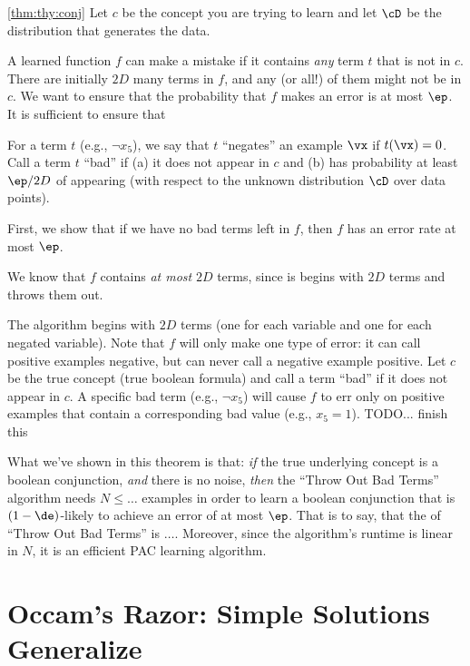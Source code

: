 \begin{myproof}{\ref{thm:thy:conj}}
  Let $c$ be the concept you are trying to learn and let $\cD$ be the
  distribution that generates the data.


  A learned function $f$ can make a mistake if it contains \emph{any}
  term $t$ that is not in $c$.  There are initially $2D$ many terms in
  $f$, and any (or all!) of them might not be in $c$.  We want to
  ensure that the probability that $f$ makes an error is at most
  $\ep$.  It is sufficient to ensure that

For a term $t$
  (e.g., $\lnot x_5$), we say that $t$ ``negates'' an example $\vx$ if
  $t(\vx) = 0$.  Call a term $t$ ``bad'' if (a) it does not appear in
  $c$ and (b) has probability at least $\ep/2D$ of appearing (with
  respect to the unknown distribution $\cD$ over data points).

  First, we show that if we have no bad terms left in $f$, then $f$
  has an error rate at most $\ep$.

We know that $f$ contains \emph{at
    most} $2D$ terms, since is begins with $2D$ terms and throws them
  out.

  The algorithm begins with $2D$ terms (one for each variable and one
  for each negated variable).  Note that $f$ will only make one type
  of error: it can call positive examples negative, but can never call
  a negative example positive.  Let $c$ be the true concept (true
  boolean formula) and call a term ``bad'' if it does not appear in
  $c$.  A specific bad term (e.g., $\lnot x_5$) will cause $f$ to err
  only on positive examples that contain a corresponding bad value
  (e.g., $x_5 = 1$).    TODO... finish this
\end{myproof}

What we've shown in this theorem is that: \emph{if} the true
underlying concept is a boolean conjunction, \emph{and} there is no
noise, \emph{then} the ``Throw Out Bad Terms'' algorithm needs $N \leq
\dots$ examples in order to learn a boolean conjunction that is
$(1-\de)$-likely to achieve an error of at most $\ep$.  That is to
say, that the  of ``Throw Out Bad Terms''
is $\dots$.  Moreover, since the algorithm's runtime is linear in $N$,
it is an efficient PAC learning algorithm.

\section{Occam's Razor: Simple Solutions Generalize}

